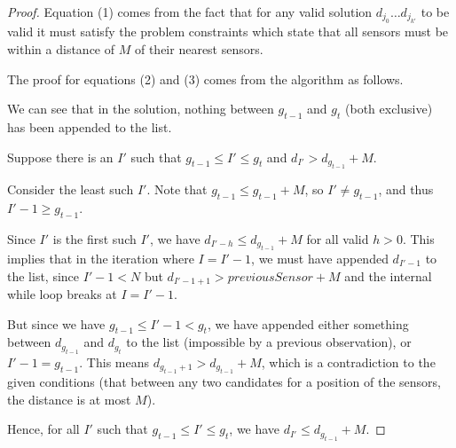 \documentclass[answers]{exam}
\begin{document}
\begin{questions}
\begin{parts}
\begin{solution}
\begin{proof}
    Equation (1) comes from the fact that for any valid solution $d_{j_0} \ldots d_{j_{k'}}$ to be valid it must satisfy the problem constraints which state that all sensors must be within a distance of $M$ of their nearest sensors.
    
    The proof for equations (2) and (3) comes from the algorithm as follows.
    
    We can see that in the solution, nothing between $g_{t - 1}$ and $g_{t}$ (both exclusive) has been appended to the list.
    
    Suppose there is an $I'$ such that $g_{t - 1} \le I' \le g_{t}$ and $d_{I'} > d_{g_{t - 1}} + M$.
    
    Consider the least such $I'$. Note that $g_{t - 1} \le g_{t - 1} + M$, so $I' \ne g_{t - 1}$, and thus $I' - 1 \ge g_{t - 1}$.
    
    Since $I'$ is the first such $I'$, we have $d_{I' - h} \le d_{g_{t - 1}} + M$ for all valid $h > 0$. This implies that in the iteration where $I = I' - 1$, we must have appended $d_{I' - 1}$ to the list, since $I' - 1 < N$ but $d_{I' - 1 + 1} > previousSensor + M$ and the internal while loop breaks at $I = I' - 1$.
    
    But since we have $g_{t - 1} \le I' - 1 < g_t$, we have appended either something between $d_{g_{t - 1}}$ and $d_{g_t}$ to the list (impossible by a previous observation), or $I' - 1 = g_{t - 1}$. This means $d_{g_{t - 1} + 1} > d_{g_{t - 1}} + M$, which is a contradiction to the given conditions (that between any two candidates for a position of the sensors, the distance is at most $M$).
    
    Hence, for all $I'$ such that $g_{t - 1} \le I' \le g_{t}$, we have $d_{I'} \le d_{g_{t - 1}} + M$.
    
    
    
    

\end{proof}
\end{solution}
\end{parts}
\end{questions}
\end{document}
